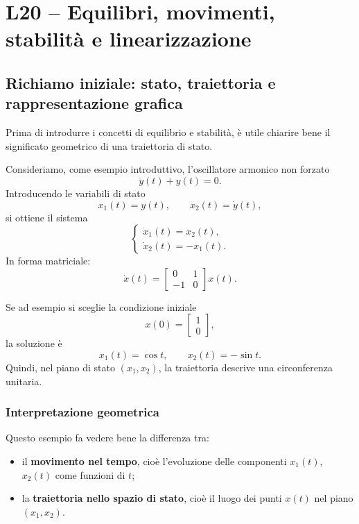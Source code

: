 
\chapter{L20 -- Equilibri, movimenti, stabilità e linearizzazione}
\label{chap:L20}

\section{Richiamo iniziale: stato, traiettoria e rappresentazione grafica}

Prima di introdurre i concetti di equilibrio e stabilità, è utile chiarire bene il significato geometrico di una traiettoria di stato.

Consideriamo, come esempio introduttivo, l'oscillatore armonico non forzato
\[
\ddot y(t) + y(t) = 0.
\]
Introducendo le variabili di stato
\[
x_1(t)=y(t), 
\qquad
x_2(t)=\dot y(t),
\]
si ottiene il sistema
\[
\begin{cases}
\dot x_1(t)=x_2(t),\\
\dot x_2(t)=-x_1(t).
\end{cases}
\]
In forma matriciale:
\[
\dot x(t)=
\begin{bmatrix}
0 & 1\\
-1 & 0
\end{bmatrix}x(t).
\]

Se ad esempio si sceglie la condizione iniziale
\[
x(0)=
\begin{bmatrix}
1\\
0
\end{bmatrix},
\]
la soluzione è
\[
x_1(t)=\cos t,
\qquad
x_2(t)=-\sin t.
\]
Quindi, nel piano di stato \((x_1,x_2)\), la traiettoria descrive una circonferenza unitaria.

\subsection*{Interpretazione geometrica}
Questo esempio fa vedere bene la differenza tra:
\begin{itemize}
    \item il \textbf{movimento nel tempo}, cioè l'evoluzione delle componenti \(x_1(t)\), \(x_2(t)\) come funzioni di \(t\);
    \item la \textbf{traiettoria nello spazio di stato}, cioè il luogo dei punti \(x(t)\) nel piano \((x_1,x_2)\).
\end{itemize}

